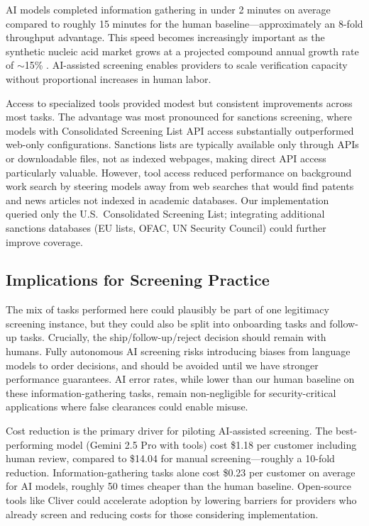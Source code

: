 \documentclass[utf8]{FrontiersinHarvard}
\begin{document}
AI models completed information gathering in under 2 minutes on average compared to roughly 15 minutes for the human baseline---approximately an 8-fold throughput advantage. This speed becomes increasingly important as the synthetic nucleic acid market grows at a projected compound annual growth rate of ${\sim}$15\% \citep{Fady2025report}. AI-assisted screening enables providers to scale verification capacity without proportional increases in human labor.

Access to specialized tools provided modest but consistent improvements across most tasks. The advantage was most pronounced for sanctions screening, where models with Consolidated Screening List API access substantially outperformed web-only configurations. Sanctions lists are typically available only through APIs or downloadable files, not as indexed webpages, making direct API access particularly valuable. However, tool access reduced performance on background work search by steering models away from web searches that would find patents and news articles not indexed in academic databases. Our implementation queried only the U.S.\ Consolidated Screening List; integrating additional sanctions databases (EU lists, OFAC, UN Security Council) could further improve coverage.

\subsection{Implications for Screening Practice}

The mix of tasks performed here could plausibly be part of one legitimacy screening instance, but they could also be split into onboarding tasks and follow-up tasks. Crucially, the ship/follow-up/reject decision should remain with humans. Fully autonomous AI screening risks introducing biases from language models to order decisions, and should be avoided until we have stronger performance guarantees. AI error rates, while lower than our human baseline on these information-gathering tasks, remain non-negligible for security-critical applications where false clearances could enable misuse.

Cost reduction is the primary driver for piloting AI-assisted screening. The best-performing model (Gemini 2.5 Pro with tools) cost \$1.18 per customer including human review, compared to \$14.04 for manual screening---roughly a 10-fold reduction. Information-gathering tasks alone cost \$0.23 per customer on average for AI models, roughly 50 times cheaper than the human baseline. Open-source tools like Cliver \citep{Cliver2025} could accelerate adoption by lowering barriers for providers who already screen and reducing costs for those considering implementation.
\end{document}
